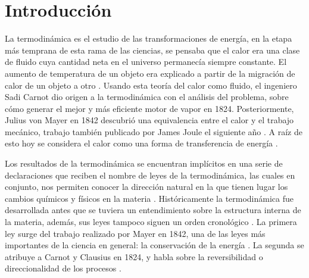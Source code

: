 
%


\newcommand{\keyword}[1]{\textit{#1}}


\chapter{Introducción}
	La termodinámica es el estudio de las transformaciones de energía, en la etapa más temprana de esta rama de las ciencias, se pensaba que el calor era una clase de fluido cuya cantidad neta en el universo permanecía siempre constante. El aumento de temperatura de un objeto era explicado a partir de la migración de calor de un objeto a otro \cite{feynman2011feynman, fermi1986}. Usando esta teoría del calor como fluido, el ingeniero Sadi Carnot dio origen a la termodinámica con el análisis del problema, sobre cómo generar el mejor y más eficiente motor de vapor en 1824. Posteriormente, Julius von Mayer en 1842 descubrió una equivalencia entre el calor y el trabajo mecánico, trabajo también publicado por James Joule el siguiente año \cite{fermi1986}. A raíz de esto hoy se considera el calor como una forma de transferencia de energía \cite{fermi1986}.
	
	Los resultados de la termodinámica se encuentran implícitos en una serie de declaraciones que reciben el nombre de leyes de la termodinámica, las cuales en conjunto, nos permiten conocer la dirección natural en la que tienen lugar los cambios químicos y físicos en la materia \cite{atkins2011physical}. Históricamente la termodinámica fue desarrollada antes que se tuviera un entendimiento sobre la estructura interna de la materia, además, sus leyes tampoco siguen un orden cronológico \cite{feynman2011feynman}. La primera ley surge del trabajo realizado por Mayer en 1842, una de las leyes más importantes de la ciencia en general: la conservación de la energía \cite{feynman2011feynman, fermi1986}. La segunda se atribuye a Carnot y Clausius en 1824, y habla sobre la reversibilidad o direccionalidad de los procesos \cite{feynman2011feynman}.
	
